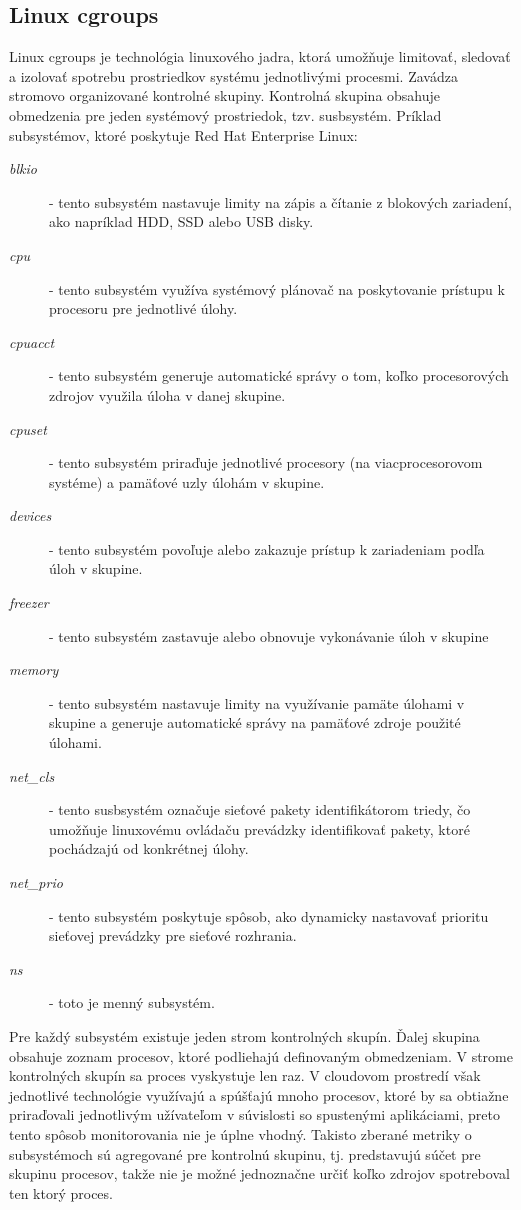 \documentclass[12pt,twoside,color,cover,table]{fithesis3}
\begin{document}
\subsection{Linux cgroups}
Linux cgroups je technológia linuxového jadra, ktorá umožňuje limitovať, sledovať a izolovať spotrebu prostriedkov systému jednotlivými procesmi. Zavádza stromovo organizované kontrolné skupiny. 
Kontrolná skupina obsahuje obmedzenia pre jeden systémový prostriedok, tzv. susbsystém. Príklad subsystémov, ktoré poskytuje Red Hat Enterprise Linux: 
\begin{description}
\item[\emph{blkio}] - tento subsystém nastavuje limity na zápis a čítanie z blokových zariadení, ako napríklad HDD, SSD alebo USB disky.
\item[\emph{cpu}] - tento subsystém využíva systémový plánovač na poskytovanie prístupu k procesoru pre jednotlivé úlohy.
\item[\emph{cpuacct}] - tento subsystém generuje automatické správy o tom, koľko procesorových zdrojov využila úloha v danej skupine.
\item[\emph{cpuset}] - tento subsystém priraďuje jednotlivé procesory (na viacprocesorovom systéme) a pamäťové uzly úlohám v skupine.
\item[\emph{devices}] - tento subsystém povoľuje alebo zakazuje prístup k zariadeniam podľa úloh v skupine.
\item[\emph{freezer}] - tento subsystém zastavuje alebo obnovuje vykonávanie úloh v skupine
\item[\emph{memory}] - tento subsystém nastavuje limity na využívanie pamäte úlohami v skupine a generuje automatické správy na pamäťové zdroje použité úlohami.
\item[\emph{net\_cls}] - tento susbsystém označuje sieťové pakety identifikátorom triedy, čo umožňuje linuxovému ovládaču prevádzky identifikovať pakety, ktoré pochádzajú od konkrétnej úlohy.
\item[\emph{net\_prio}] - tento subsystém poskytuje spôsob, ako dynamicky nastavovať prioritu sieťovej prevádzky pre sieťové rozhrania.
\item[\emph{ns}] - toto je menný subsystém.
\end{description}

Pre každý subsystém existuje jeden strom kontrolných skupín. Ďalej skupina obsahuje zoznam procesov, ktoré podliehajú definovaným obmedzeniam. V strome kontrolných skupín sa proces vyskystuje len raz.
V cloudovom prostredí však jednotlivé technológie využívajú a spúšťajú mnoho procesov, ktoré by sa obtiažne priraďovali jednotlivým užívateľom v súvislosti so spustenými aplikáciami, preto tento spôsob
monitorovania nie je úplne vhodný. Takisto zberané metriky o subsystémoch sú agregované pre kontrolnú skupinu, tj. predstavujú súčet pre skupinu procesov, takže nie je možné jednoznačne určiť koľko zdrojov spotreboval
ten ktorý proces.
\end{document}

